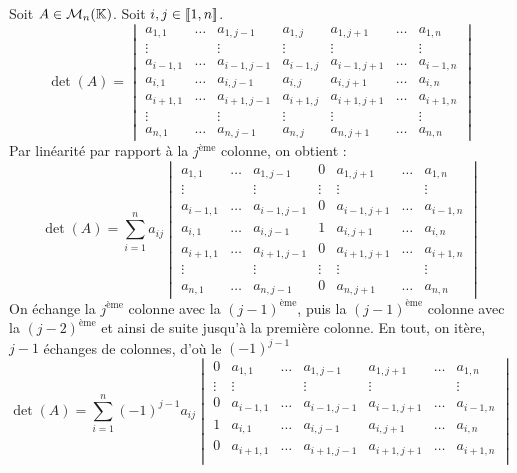\documentclass{book}
\begin{document}
\begin{Demonstration}
Soit $A\in\MnK$.
Soit $i,j\in\Intf{1}{n}$.
$$ \det(A) = \begin{vmatrix}
a_{1,1} & \dots & a_{1,j-1}& a_{1,j} & a_{1,j+1} &\dots & a_{1,n}\\
\vdots &&\vdots &\vdots &\vdots&&\vdots \\
a_{i-1,1} & \dots & a_{i-1,j-1}& a_{i-1,j} & a_{i-1,j+1} &\dots & a_{i-1,n}\\
a_{i,1} & \dots & a_{i,j-1}& a_{i,j} & a_{i,j+1} &\dots & a_{i,n}\\
a_{i+1,1} & \dots & a_{i+1,j-1}& a_{i+1,j} & a_{i+1,j+1} &\dots & a_{i+1,n}\\
\vdots &&\vdots &\vdots &\vdots&&\vdots \\
a_{n,1} & \dots & a_{n,j-1}& a_{n,j} & a_{n,j+1}& \dots & a_{n,n}
\end{vmatrix}$$
Par linéarité par rapport à la $j^{\text{ème}}$ colonne, on obtient :
$$ \det(A) = \sum_{i=1}^na_{ij} \begin{vmatrix}
a_{1,1} & \dots & a_{1,j-1}& 0 & a_{1,j+1} &\dots & a_{1,n}\\
\vdots &&\vdots &\vdots &\vdots&&\vdots \\
a_{i-1,1} & \dots & a_{i-1,j-1}& 0 & a_{i-1,j+1} &\dots & a_{i-1,n}\\
a_{i,1} & \dots & a_{i,j-1}& 1 & a_{i,j+1} &\dots & a_{i,n}\\
a_{i+1,1} & \dots & a_{i+1,j-1}& 0 & a_{i+1,j+1} &\dots & a_{i+1,n}\\
\vdots &&\vdots &\vdots &\vdots&&\vdots \\
a_{n,1} & \dots & a_{n,j-1} & 0& a_{n,j+1}& \dots & a_{n,n}
\end{vmatrix}$$
On échange la $j^{\text{ème}}$ colonne avec la $(j-1)^{\text{ème}}$, 
puis la $(j-1)^{\text{ème}}$ colonne avec la $(j-2)^{\text{ème}}$ 
et ainsi de suite jusqu'à la première colonne. En tout, on itère, $j- 1$ échanges de colonnes, d'où le $(-1)^{j-1}$
$$ \det(A) = \sum_{i=1}^n (-1)^{j-1} a_{ij} \begin{vmatrix}
0&a_{1,1} & \dots & a_{1,j-1} & a_{1,j+1} &\dots & a_{1,n}\\
\vdots &\vdots &&\vdots  &\vdots&&\vdots \\
0&a_{i-1,1} & \dots & a_{i-1,j-1} & a_{i-1,j+1} &\dots & a_{i-1,n}\\
1&a_{i,1} & \dots & a_{i,j-1} & a_{i,j+1} &\dots & a_{i,n}\\
0&a_{i+1,1} & \dots & a_{i+1,j-1} & a_{i+1,j+1} &\dots & a_{i+1,n}\\

\end{vmatrix}$$
\end{Demonstration}
\end{document}
